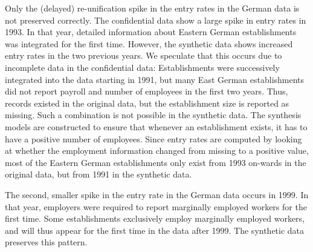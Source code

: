 \documentclass[10pt]{article}
\begin{document}
Only the (delayed) re-unification spike in the entry rates in the German data is not preserved correctly. The confidential data show a large spike in entry rates in 1993. In that year, detailed information about Eastern German establishments was integrated for the first time. However, the synthetic data shows increased entry rates in the two previous years. We speculate that this occurs due to incomplete data in the confidential data: Establishments were successively integrated into the data starting in 1991, but  many East German establishments did not report payroll and number of employees  in the first two years. Thus, records existed in the original data, but the establishment size is reported as missing. Such a combination is not possible in the synthetic data. The synthesis models are constructed to ensure that whenever an establishment exists, it has to have a positive number of employees. Since entry rates are computed by looking at whether the employment information changed from missing to a positive value, most of the Eastern German establishments only exist from 1993 on-wards in the original data, but from 1991 in the synthetic data.

The second, smaller spike in the entry rate in the German data occurs in 1999. In that year, employers were required to report  marginally employed workers  for the first time. Some establishments exclusively employ marginally employed workers, and will thus appear for the first time in the data after 1999. The synthetic data preserves this pattern. 
\end{document}
